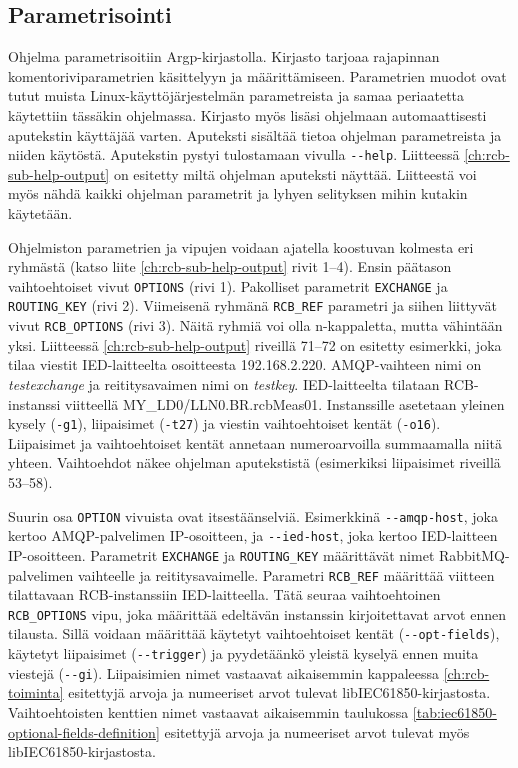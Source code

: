 \subsection{Parametrisointi}
Ohjelma parametrisoitiin Argp-kirjastolla. Kirjasto tarjoaa rajapinnan komentoriviparametrien käsittelyyn ja määrittämiseen. Parametrien muodot ovat tutut muista Linux-käyt\-tö\-jär\-jes\-tel\-män parametreista ja samaa periaatetta käytettiin tässäkin ohjelmassa. Kirjasto myös lisäsi ohjelmaan automaattisesti aputekstin käyttäjää varten. Aputeksti sisältää tietoa ohjelman parametreista ja niiden käytöstä. Aputekstin pystyi tulostamaan vivulla \texttt{-{}-help}. Liitteessä \ref{ch:rcb-sub-help-output} on esitetty miltä ohjelman aputeksti näyttää. Liitteestä voi myös nähdä kaikki ohjelman parametrit ja lyhyen selityksen mihin kutakin käytetään.

Ohjelmiston parametrien ja vipujen voidaan ajatella koostuvan kolmesta eri ryhmästä (katso liite \ref{ch:rcb-sub-help-output} rivit 1--4). Ensin päätason vaihtoehtoiset vivut \texttt{OPTIONS} (rivi 1). Pakolliset parametrit \texttt{EXCHANGE} ja \texttt{ROUTING\_KEY} (rivi 2). Viimeisenä ryhmänä \texttt{RCB\_REF} parametri ja siihen liittyvät vivut \texttt{RCB\_OPTIONS} (rivi 3). Näitä ryhmiä voi olla n-kappaletta, mutta vähintään yksi. Liitteessä \ref{ch:rcb-sub-help-output} riveillä 71--72 on esitetty esimerkki, joka tilaa viestit IED-laitteelta osoitteesta 192.168.2.220. AMQP-vaihteen nimi on \emph{testexchange} ja reititysavaimen nimi on \emph{testkey}. IED-laitteelta tilataan RCB-instanssi viitteellä MY\_LD0\-/\-LLN0\-.\-BR\-.\-rcbMeas01. Instanssille asetetaan yleinen kysely (\texttt{-g1}), liipaisimet (\texttt{-t27}) ja viestin vaihtoehtoiset kentät (\texttt{-o16}). Liipaisimet ja vaihtoehtoiset kentät annetaan numeroarvoilla summaamalla niitä yhteen. Vaihtoehdot näkee ohjelman aputekstistä (esimerkiksi liipaisimet riveillä 53--58).

Suurin osa \texttt{OPTION} vivuista ovat itsestäänselviä. Esimerkkinä \texttt{-{}-amqp-host}, joka kertoo A\-M\-Q\-P-pal\-ve\-li\-men IP-osoitteen, ja \texttt{-{}-ied-host}, joka kertoo IED-laitteen IP-osoitteen. Parametrit \texttt{EXCHANGE} ja \texttt{ROUTING\_KEY} määrittävät nimet RabbitMQ-palvelimen vaihteelle ja reititysavaimelle. Parametri \texttt{RCB\_REF} määrittää viitteen tilattavaan RCB-instanssiin IED-laitteella. Tätä seuraa vaihtoehtoinen \texttt{RCB\_OPTIONS} vipu, joka määrittää edeltävän instanssin kirjoitettavat arvot ennen tilausta. Sillä voidaan määrittää käytetyt vaihtoehtoiset kentät (\texttt{-{}-opt-fields}), käytetyt liipaisimet (\texttt{-{}-trigger}) ja pyydetäänkö yleistä kyselyä ennen muita viestejä (\texttt{-{}-gi}). Liipaisimien nimet vastaavat aikaisemmin kappaleessa \ref{ch:rcb-toiminta} esitettyjä arvoja ja numeeriset arvot tulevat libIEC61850-kirjastosta. Vaihtoehtoisten kenttien nimet vastaavat aikaisemmin taulukossa \ref{tab:iec61850-optional-fields-definition} esitettyjä arvoja ja numeeriset arvot tulevat myös libIEC61850-kirjastosta.

